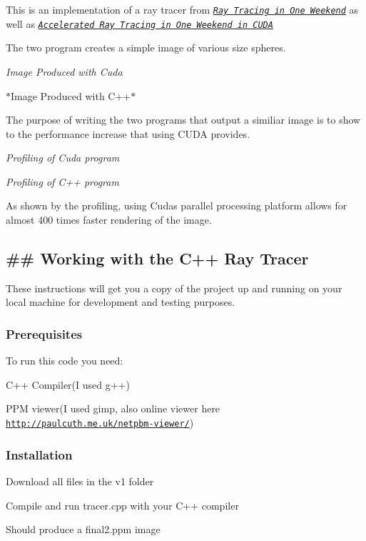This is an implementation of a ray tracer from \href{https://raytracing.github.io/books/RayTracingInOneWeekend.html#metal}{\tt {\itshape Ray Tracing in One Weekend}} as well as \href{https://devblogs.nvidia.com/accelerated-ray-tracing-cuda/}{\tt {\itshape Accelerated Ray Tracing in One Weekend in C\+U\+DA}}

The two program creates a simple image of various size spheres.

 {\itshape Image Produced with Cuda}

 $\ast$\+Image Produced with C++$\ast$

The purpose of writing the two programs that output a similiar image is to show to the performance increase that using C\+U\+DA provides.

 {\itshape Profiling of Cuda program}

 {\itshape Profiling of C++ program}

As shown by the profiling, using Cuda\textquotesingle{}s parallel processing platform allows for almost 400 times faster rendering of the image.

\subsection*{\#\# Working with the C++ Ray Tracer }

 These instructions will get you a copy of the project up and running on your local machine for development and testing purposes.

\subsubsection*{Prerequisites}

To run this code you need\+:
\begin{DoxyEnumerate}
\item C++ Compiler(I used g++)
\item P\+PM viewer(I used gimp, also online viewer here \href{http://paulcuth.me.uk/netpbm-viewer/}{\tt http\+://paulcuth.\+me.\+uk/netpbm-\/viewer/})
\end{DoxyEnumerate}

\subsubsection*{Installation}


\begin{DoxyEnumerate}
\item Download all files in the v1 folder
\item Compile and run tracer.\+cpp with your C++ compiler
\item Should produce a final2.\+ppm image
\end{DoxyEnumerate}

